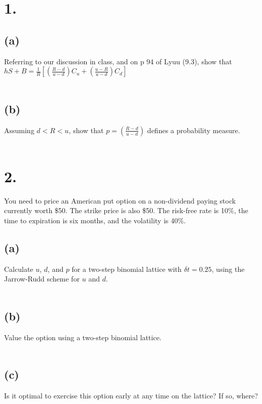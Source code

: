 \documentclass{article}
\begin{document}
\thispagestyle{firstpageheader}

\section*{1.}
{\Large 

\subsection*{(a)}

Referring to our discussion in class, and on p 94 of Lyuu (9.3), show that \\
$hS + B = \frac{1}{R}[(\frac{R - d}{u - d})C_u + (\frac{u - R}{u - d})C_d] $ \\ \\ 

\subsection*{(b)}

Assuming $d < R < u$, show that $p = (\frac{R - d}{u - d})$ defines a probability measure. \\ \\

}

\section*{2.}
{\Large

You need to price an American put option on a non-dividend paying stock currently worth \$50.  The strike price is also \$50.  The risk-free rate is 10\%, the time to expiration is six months, and the volatility is 40\%.


\subsection*{(a)}

Calculate $u$, $d$, and $p$ for a two-step binomial lattice with $\delta t = 0.25$, using the Jarrow-Rudd scheme for $u$ and $d$. \\ \\

\subsection*{(b)}

Value the option using a two-step binomial lattice. \\ \\

\subsection*{(c)}

Is it optimal to exercise this option early at any time on the lattice? If so, where? \\ \\

}
\end{document}
